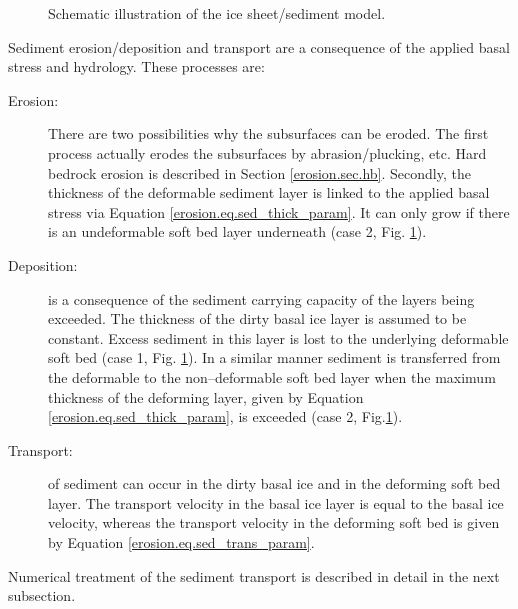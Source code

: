 \begin{figure}[htbp]
  \centering
  
  \caption{Schematic illustration of the ice sheet/sediment model.}
  \label{erosion.fig.ice_sed_model}
\end{figure}

Sediment erosion/deposition and transport are a consequence of the applied basal stress and hydrology. These processes are:
\begin{description}
\item[Erosion:] There are two possibilities why the subsurfaces can be eroded. The first process actually erodes the subsurfaces by abrasion/plucking, etc. Hard bedrock erosion is described in Section \ref{erosion.sec.hb}. Secondly, the thickness of the deformable sediment layer is linked to the applied basal stress via Equation \eqref{erosion.eq.sed_thick_param}. It can only grow if there is an undeformable soft bed layer underneath (case 2, Fig. \ref{erosion.fig.ice_sed_model}).
\item[Deposition:] is a consequence of the sediment carrying capacity of the layers being exceeded. The thickness of the dirty basal ice layer is assumed to be
constant. Excess sediment in this layer is lost to the underlying deformable soft bed (case 1, Fig. \ref{erosion.fig.ice_sed_model}). In a similar manner sediment is transferred from the deformable to the non--deformable soft bed layer when the maximum thickness of the deforming layer, given by Equation \eqref{erosion.eq.sed_thick_param}, is exceeded (case 2, Fig.\ref{erosion.fig.ice_sed_model}).
\item[Transport:] of sediment can occur in the dirty basal ice and in the deforming soft bed layer. The transport velocity in the basal ice layer is equal to the basal ice velocity, whereas the transport velocity in the deforming soft bed is given by Equation \eqref{erosion.eq.sed_trans_param}.
\end{description}
Numerical treatment of the sediment transport is described in detail in the next subsection.

